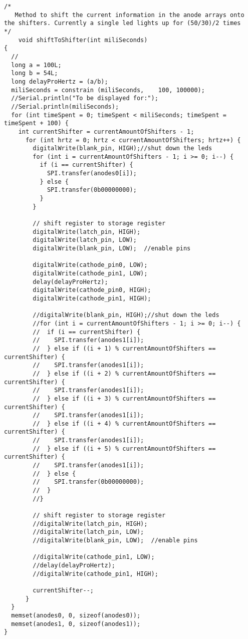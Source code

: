 \documentclass[12pt,a4paper]{article}
\begin{document}
\begin{lstlisting}[language=Arduino]
    /*
   Method to shift the current information in the anode arrays onto the shifters. Currently a single led lights up for (50/30)/2 times
*/
    void shiftToShifter(int miliSeconds)
{
  //
  long a = 100L;
  long b = 54L;
  long delayProHertz = (a/b);
  miliSeconds = constrain (miliSeconds,    100, 100000);
  //Serial.println("To be displayed for:");
  //Serial.println(miliSeconds);
  for (int timeSpent = 0; timeSpent < miliSeconds; timeSpent = timeSpent + 100) {
    int currentShifter = currentAmountOfShifters - 1;
      for (int hrtz = 0; hrtz < currentAmountOfShifters; hrtz++) {
        digitalWrite(blank_pin, HIGH);//shut down the leds
        for (int i = currentAmountOfShifters - 1; i >= 0; i--) {
          if (i == currentShifter) {
            SPI.transfer(anodes0[i]);
          } else {
            SPI.transfer(0b00000000);
          }
        }

        // shift register to storage register
        digitalWrite(latch_pin, HIGH);
        digitalWrite(latch_pin, LOW);
        digitalWrite(blank_pin, LOW);  //enable pins

        digitalWrite(cathode_pin0, LOW);
        digitalWrite(cathode_pin1, LOW);
        delay(delayProHertz);
        digitalWrite(cathode_pin0, HIGH);
        digitalWrite(cathode_pin1, HIGH);

        //digitalWrite(blank_pin, HIGH);//shut down the leds
        //for (int i = currentAmountOfShifters - 1; i >= 0; i--) {
        //  if (i == currentShifter) {
        //    SPI.transfer(anodes1[i]);
        //  } else if ((i + 1) % currentAmountOfShifters == currentShifter) {
        //    SPI.transfer(anodes1[i]);
        //  } else if ((i + 2) % currentAmountOfShifters == currentShifter) {
        //    SPI.transfer(anodes1[i]);
        //  } else if ((i + 3) % currentAmountOfShifters == currentShifter) {
        //    SPI.transfer(anodes1[i]);
        //  } else if ((i + 4) % currentAmountOfShifters == currentShifter) {
        //    SPI.transfer(anodes1[i]);
        //  } else if ((i + 5) % currentAmountOfShifters == currentShifter) {
        //    SPI.transfer(anodes1[i]);
        //  } else {
        //    SPI.transfer(0b00000000);
        //  }
        //}

        // shift register to storage register
        //digitalWrite(latch_pin, HIGH);
        //digitalWrite(latch_pin, LOW);
        //digitalWrite(blank_pin, LOW);  //enable pins

        //digitalWrite(cathode_pin1, LOW);
        //delay(delayProHertz);
        //digitalWrite(cathode_pin1, HIGH);

        currentShifter--;
      }
  }
  memset(anodes0, 0, sizeof(anodes0));
  memset(anodes1, 0, sizeof(anodes1));
}
\end{lstlisting}
\end{document}
